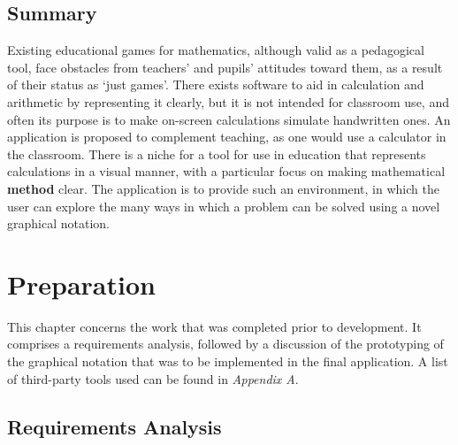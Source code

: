\documentclass[12pt,twoside,notitlepage,xetex]{report}
\begin{document}
\section{Summary}

Existing educational games for mathematics, although valid as a pedagogical tool, face obstacles from teachers' and pupils' attitudes toward them, as a result of their status as `just games'.  There exists software to aid in calculation and arithmetic by representing it clearly, but it is not intended for classroom use, and often its purpose is to make on-screen calculations simulate handwritten ones.  An application is proposed to complement teaching, as one would use a calculator in the classroom.  There is a niche for a tool for use in education that represents calculations in a visual manner, with a particular focus on making mathematical {\bf method} clear.  The application is to provide such an environment, in which the user can explore the many ways in which a problem can be solved using a novel graphical notation.%

\cleardoublepage



\chapter{Preparation}

This chapter concerns the work that was completed prior to development.  It comprises a requirements analysis, followed by a discussion of the prototyping of the graphical notation that was to be implemented in the final application.  A list of third-party tools used can be found in \emph{Appendix A}.

\section{Requirements Analysis}
\end{document}
